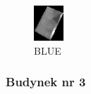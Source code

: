 \documentclass[a4paper,12pt]{article}  %
\begin{document}
\begin{figure}[H]
\begin{minipage}{0.24\textwidth}
        \includegraphics[width=\linewidth]{spektralne/blue_budynek3.png}
        \caption*{BLUE}
    \end{minipage}
\end{figure}

\subsubsection{Budynek nr 3}
\end{document}
